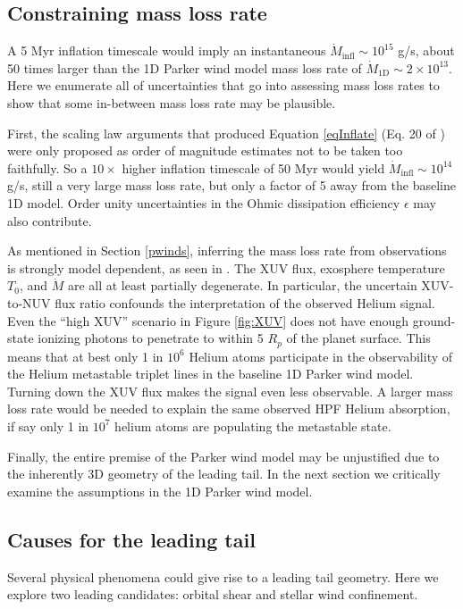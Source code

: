 \documentclass[twocolumn]{aastex631}
\begin{document}
\subsection{Constraining mass loss rate}
A 5 Myr inflation timescale would imply an instantaneous $\dot{M}_\mathrm{infl}\sim10^{15}$ g/s, about 50 times larger than the 1D Parker wind model mass loss rate of $\dot{M}_\mathrm{1D}\sim2\times10^{13}$. Here we enumerate all of uncertainties that go into assessing mass loss rates to show that some in-between mass loss rate may be plausible.

First, the scaling law arguments that produced Equation \ref{eqInflate} (Eq. 20 of \citet{2011ApJ...738....1B}) were only proposed as order of magnitude estimates not to be taken too faithfully.  So a $10\times$ higher inflation timescale of 50 Myr would yield $\dot{M}_\mathrm{infl}\sim10^{14}$ g/s, still a very large mass loss rate, but only a factor of 5 away from the baseline 1D model.  Order unity uncertainties in the Ohmic dissipation efficiency $\epsilon$ may also contribute.

As mentioned in Section \ref{pwinds}, inferring the mass loss rate from observations is strongly model dependent, as seen in .  The XUV flux, exosphere temperature $T_0$, and $\dot{M}$ are all at least partially degenerate.  In particular, the uncertain XUV-to-NUV flux ratio confounds the interpretation of the observed Helium signal.  Even the ``high XUV'' scenario in Figure \ref{fig:XUV} does not have enough ground-state ionizing photons to penetrate to within 5 $R_p$ of the planet surface.  This means that at best only 1 in $10^{6}$ Helium atoms participate in the observability of the Helium metastable triplet lines in the baseline 1D Parker wind model.  Turning down the XUV flux makes the signal even less observable.  A larger mass loss rate would be needed to explain the same observed HPF Helium absorption, if say only 1 in $10^{7}$ helium atoms are populating the metastable state.

Finally, the entire premise of the Parker wind model may be unjustified due to the inherently 3D geometry of the leading tail.  In the next section we critically examine the assumptions in the 1D Parker wind model.

\subsection{Causes for the leading tail}
Several physical phenomena could give rise to a leading tail geometry.  Here we explore two leading candidates: orbital shear and stellar wind confinement.
\end{document}
